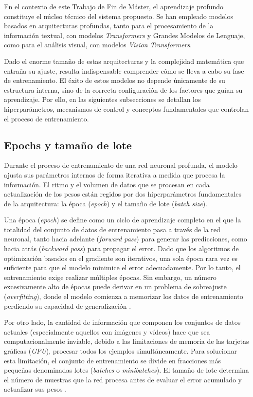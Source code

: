 En el contexto de este Trabajo de Fin de Máster, el aprendizaje profundo constituye el núcleo técnico del sistema propuesto. Se han empleado modelos basados en arquitecturas profundas, tanto para el procesamiento de la información textual, con modelos \textit{Transformers} y Grandes Modelos de Lenguaje, como para el análisis visual, con modelos \textit{Vision Transformers}.

Dado el enorme tamaño de estas arquitecturas y la complejidad matemática que entraña su ajuste, resulta indispensable comprender cómo se lleva a cabo su fase de entrenamiento. El éxito de estos modelos no depende únicamente de su estructura interna, sino de la correcta configuración de los factores que guían su aprendizaje. Por ello, en las siguientes subsecciones se detallan los hiperparámetros, mecanismos de control y conceptos fundamentales que controlan el proceso de entrenamiento. 

\subsection{Epochs y tamaño de lote}
\label{subsec:EpochsBatch}
Durante el proceso de entrenamiento de una red neuronal profunda, el modelo ajusta sus parámetros internos de forma iterativa a medida que procesa la información. El ritmo y el volumen de datos que se procesan en cada actualización de los pesos están regidos por dos hiperparámetros fundamentales de la arquitectura: la época (\textit{epoch}) y el tamaño de lote (\textit{batch size}).

Una época (\textit{epoch}) se define como un ciclo de aprendizaje completo en el que la totalidad del conjunto de datos de entrenamiento pasa a través de la red neuronal, tanto hacia adelante (\textit{forward pass}) para generar las predicciones, como hacia atrás (\textit{backward pass}) para propagar el error. Dado que los algoritmos de optimización basados en el gradiente son iterativos, una sola época rara vez es suficiente para que el modelo minimice el error adecuadamente. Por lo tanto, el entrenamiento exige realizar múltiples épocas. Sin embargo, un número excesivamente alto de épocas puede derivar en un problema de sobreajuste (\textit{overfitting}), donde el modelo comienza a memorizar los datos de entrenamiento perdiendo su capacidad de generalización \cite{prechelt2002early}.

Por otro lado, la cantidad de información que componen los conjuntos de datos actuales (especialmente aquellos con imágenes y vídeos) hace que sea computacionalmente inviable, debido a las limitaciones de memoria de las tarjetas gráficas (\textit{GPU}), procesar todos los ejemplos simultáneamente. Para solucionar esta limitación, el conjunto de entrenamiento se divide en fracciones más pequeñas denominadas lotes (\textit{batches} o \textit{minibatches}). El tamaño de lote determina el número de muestras que la red procesa antes de evaluar el error acumulado y actualizar sus pesos \cite{bengio2012practical}.

